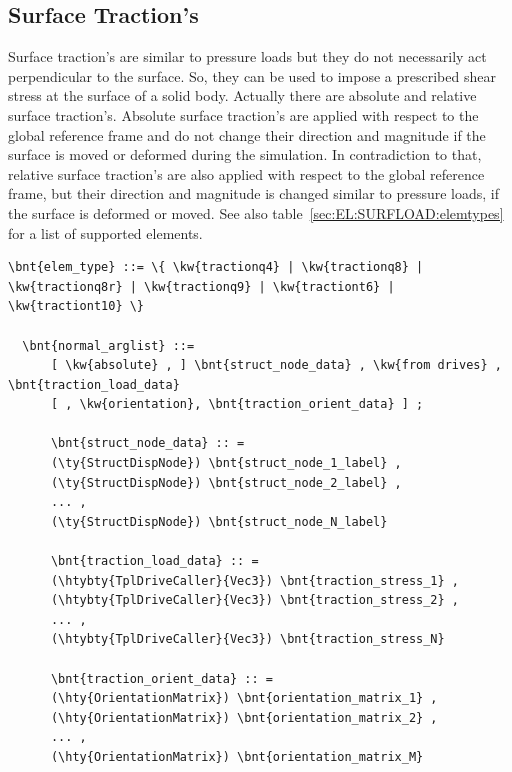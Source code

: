 \subsection{Surface Traction's}
Surface traction's are similar to pressure loads but they do not necessarily act perpendicular to the surface.
So, they can be used to impose a prescribed shear stress at the surface of a solid body.
Actually there are absolute and relative surface traction's. Absolute surface traction's are applied with respect
to the global reference frame and do not change their direction and magnitude if the surface is moved
or deformed during the simulation. In contradiction to that, relative surface traction's are also applied with respect
to the global reference frame, but their direction and magnitude is changed similar to pressure loads, if the surface is deformed or moved.
See also table~\ref{sec:EL:SURFLOAD:elemtypes} for a list of supported elements.
\begin{Verbatim}[commandchars=\\\{\}]
  \bnt{elem_type} ::= \{ \kw{tractionq4} | \kw{tractionq8} | \kw{tractionq8r} | \kw{tractionq9} | \kw{tractiont6} | \kw{tractiont10} \}

  \bnt{normal_arglist} ::=
      [ \kw{absolute} , ] \bnt{struct_node_data} , \kw{from drives} , \bnt{traction_load_data}
      [ , \kw{orientation}, \bnt{traction_orient_data} ] ;

      \bnt{struct_node_data} :: =
      (\ty{StructDispNode}) \bnt{struct_node_1_label} ,
      (\ty{StructDispNode}) \bnt{struct_node_2_label} ,
      ... ,
      (\ty{StructDispNode}) \bnt{struct_node_N_label}

      \bnt{traction_load_data} :: =
      (\htybty{TplDriveCaller}{Vec3}) \bnt{traction_stress_1} ,
      (\htybty{TplDriveCaller}{Vec3}) \bnt{traction_stress_2} ,
      ... ,
      (\htybty{TplDriveCaller}{Vec3}) \bnt{traction_stress_N}

      \bnt{traction_orient_data} :: =
      (\hty{OrientationMatrix}) \bnt{orientation_matrix_1} ,
      (\hty{OrientationMatrix}) \bnt{orientation_matrix_2} ,
      ... ,
      (\hty{OrientationMatrix}) \bnt{orientation_matrix_M}
\end{Verbatim}

